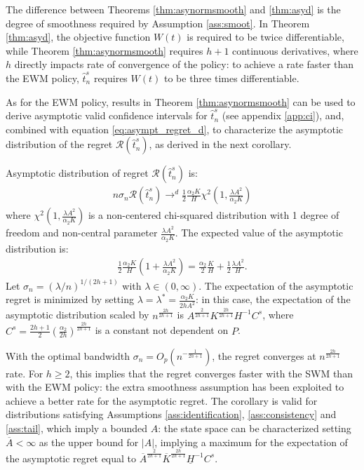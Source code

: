 {The difference between Theorems \ref{thm:asynormsmooth} and \ref{thm:asyd} is the degree of smoothness required by Assumption \ref{ass:smoot}. In Theorem \ref{thm:asyd}, the objective function $W(t)$ is required to be twice differentiable, while Theorem \ref{thm:asynormsmooth} requires $h+1$ continuous derivatives, where $h$ directly impacts rate of convergence of the policy: to achieve a rate faster than the EWM policy, $\hat{t}^s_n$ requires $W(t)$ to be three times differentiable.

As for the EWM policy, results in Theorem \ref{thm:asynormsmooth} can be used to derive asymptotic valid confidence intervals for $\hat{t}^s_n$ (see appendix \ref{app:ci}), and, combined with equation \ref{eq:asympt_regret_d}, to characterize the asymptotic distribution of the regret $\mathcal{R}(\hat{t}^s_n)$, as derived in the next corollary.

\begin{corollary} \label{cor:smoot_regret}
    Asymptotic distribution of regret $\mathcal{R}(\hat{t}^s_n)$ is:
    \begin{gather*}
        n \sigma_n \mathcal{R}(\hat{t}^s_n) \rightarrow^d  \frac{1}{2} \frac{\alpha_2 K}{H} \chi^2\left(1,\frac{\lambda A^2}{\alpha_2 K}\right)
    \end{gather*}
    where $\chi^2\left(1,\frac{\lambda A^2}{\alpha_2 K}\right)$ is a non-centered chi-squared distribution with 1 degree of freedom and non-central parameter $\frac{\lambda A^2}{\alpha_2 K}$.
    The expected value of the asymptotic distribution is:
    \begin{align} \label{eq:expregretswm}
        \frac{1}{2} \frac{\alpha_2 K}{H} \left(1 + \frac{\lambda A^2}{\alpha_2 K} \right) =  \frac{\alpha_2}{2} \frac{ K}{H} + \frac{1}{2} \frac{\lambda A^2}{H}.
    \end{align}
    Let $\sigma_n = (\lambda/n)^{1/(2h +1)}$ with $\lambda \in (0, \infty)$. The expectation of the asymptotic regret is minimized by setting $\lambda = \lambda^* = \frac{\alpha_2 K}{2hA^2 }$: in this case, the expectation of the asymptotic distribution scaled by $n^\frac{2h}{2h+1}$ is $ A^{\frac{2}{2h+1}} K^{\frac{2h}{2h+1}} H^{-1} C^s$, where $C^s = \frac{2h+1}{2} \left( \frac{\alpha_2}{2h} \right)^\frac{2h}{2h+1}$ is a constant not dependent on $P$.
\end{corollary}

With the optimal bandwidth $\sigma_n =O_p(n^{-\frac{1}{2h + 1}})$, the regret converges at $n^{\frac{2h}{2h + 1}}$ rate. For $h \geq 2$, this implies that the regret converges faster with the SWM than with the EWM policy: the extra smoothness assumption has been exploited to achieve a better rate for the asymptotic regret. The corollary is valid for distributions satisfying Assumptions \ref{ass:identification}, \ref{ass:consistency} and \ref{ass:tail}, which imply a bounded $A$: the state space can be characterized setting $\overline{A}< \infty$ as the upper bound for $|A|$, implying a maximum for the expectation of the asymptotic regret equal to $\overline{A}^{\frac{2}{2h+1}} \overline{K}^{\frac{2h}{2h+1}} \underline{H}^{-1} C^s$. 

}
